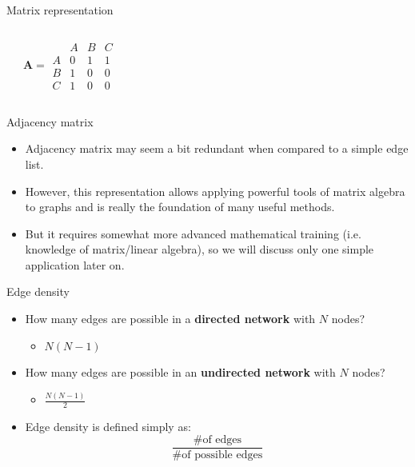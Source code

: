 \documentclass[
    hyperref={colorlinks,linkcolor=blue,urlcolor=blue,citecolor=blue}
]{beamer}
\begin{document}
\begin{frame}{Matrix representation}
\begin{columns}
\begin{center}
    \end{center}
\pause
{}
\begin{center}
    \[
        \mathbf{A} =
        \begin{array}{c|ccc}
            & A & B & C \\
            \hline
          A & 0 & 1 & 1 \\
          B & 1 & 0 & 0 \\
          C & 1 & 0 & 0
        \end{array}
    \]
\end{center}
\end{columns}
\end{frame}

\begin{frame}{Adjacency matrix}
\begin{itemize}
    \item<1-> Adjacency matrix may seem a bit redundant when compared
    to a simple edge list.
    \item<2-> However, this representation allows applying powerful tools
    of matrix algebra to graphs and is really the foundation of many useful
    methods.
    \item<3-> But it requires somewhat more advanced mathematical training
    (i.e. knowledge of matrix/linear algebra), so we will discuss only one
    simple application later on.
\end{itemize}
\end{frame}

\begin{frame}{Edge density}
\begin{itemize}
    \item<2-> How many edges are possible in a \textbf{directed network}
        with $N$ nodes?
    \begin{itemize}
        \item<3-> $N(N-1)$
    \end{itemize}
    \item<4-> How many edges are possible in an \textbf{undirected network}
    with $N$ nodes?
    \begin{itemize}
        \item<5-> $\frac{N(N-1)}{2}$
    \end{itemize}
    \item<6-> Edge density is defined simply as:
    \[
        \frac{\text{\# of edges}}{\text{\# of possible edges}}
    \]
\end{itemize}
\end{frame}
\end{document}
